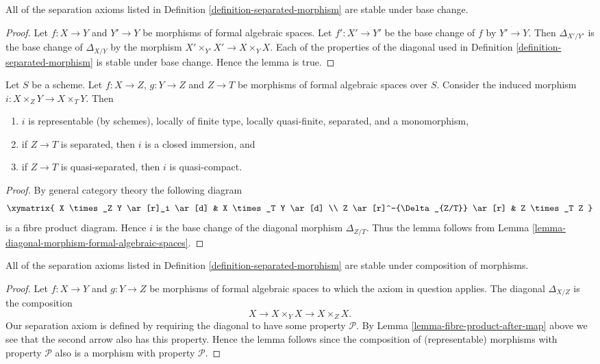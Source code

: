 \begin{lemma}
\label{lemma-base-change-separated}
All of the separation axioms listed in
Definition \ref{definition-separated-morphism}
are stable under base change.
\end{lemma}

\begin{proof}
Let $f : X \to Y$ and $Y' \to Y$ be morphisms of formal algebraic spaces.
Let $f' : X' \to Y'$ be the base change of $f$ by $Y' \to Y$. Then
$\Delta_{X'/Y'}$ is the base change of $\Delta_{X/Y}$ by
the morphism $X' \times_{Y'} X' \to X \times_Y X$. Each of the properties
of the diagonal used in Definition \ref{definition-separated-morphism}
is stable under base change. Hence the lemma is true.
\end{proof}

\begin{lemma}
\label{lemma-fibre-product-after-map}
Let $S$ be a scheme. Let $f : X \to Z$, $g : Y \to Z$ and $Z \to T$
be morphisms of formal algebraic spaces over $S$. Consider the induced
morphism $i : X \times_Z Y \to X \times_T Y$. Then
\begin{enumerate}
\item $i$ is representable (by schemes), locally of finite type,
locally quasi-finite, separated, and a monomorphism,
\item if $Z \to T$ is separated, then $i$ is a closed immersion, and
\item if $Z \to T$ is quasi-separated, then $i$ is quasi-compact.
\end{enumerate}
\end{lemma}

\begin{proof}
By general category theory the following diagram
$$
\xymatrix{
X \times_Z Y \ar[r]_i \ar[d] & X \times_T Y \ar[d] \\
Z \ar[r]^-{\Delta_{Z/T}} \ar[r] & Z \times_T Z
}
$$
is a fibre product diagram. Hence $i$ is the base change of the
diagonal morphism $\Delta_{Z/T}$. Thus the lemma follows
from Lemma \ref{lemma-diagonal-morphism-formal-algebraic-spaces}.
\end{proof}

\begin{lemma}
\label{lemma-composition-separated}
All of the separation axioms listed in
Definition \ref{definition-separated-morphism}
are stable under composition of morphisms.
\end{lemma}

\begin{proof}
Let $f : X \to Y$ and $g : Y \to Z$ be morphisms of formal algebraic spaces
to which the axiom in question applies.
The diagonal $\Delta_{X/Z}$ is the composition
$$
X \longrightarrow X \times_Y X \longrightarrow X \times_Z X.
$$
Our separation axiom is defined by requiring the diagonal
to have some property $\mathcal{P}$. By
Lemma \ref{lemma-fibre-product-after-map} above we see that
the second arrow also has this property. Hence the lemma follows
since the composition of (representable) morphisms with property
$\mathcal{P}$ also is a morphism with property $\mathcal{P}$.
\end{proof}

